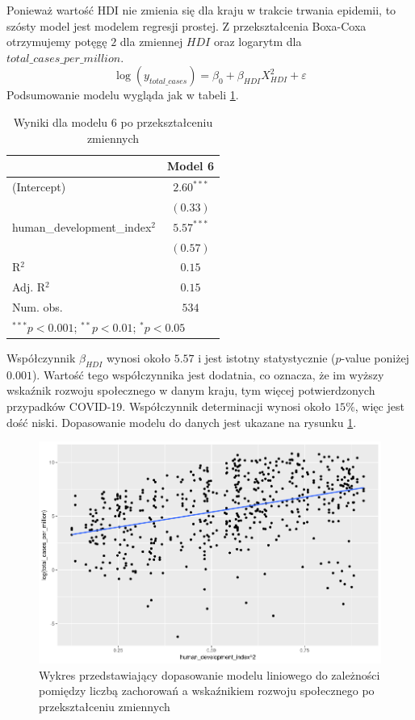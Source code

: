 \documentclass[12pt]{mwbk}
\theoremstyle{plain}
\theoremstyle{definition}
\theoremstyle{definition}
\newcommand\zrodlo[1]{\par\vspace{-3mm}{\small\textit{Źródło: }#1 }}
\begin{document}
Ponieważ wartość HDI nie zmienia się dla kraju w trakcie trwania epidemii, to szósty model jest modelem regresji prostej.
Z przekształcenia Boxa-Coxa otrzymujemy potęgę $2$ dla zmiennej $HDI$ oraz logarytm dla $total\_cases\_per\_million$.
$$\log(y_{total\_cases})=\beta_0+\beta_{HDI}X^2_{HDI}+\varepsilon$$
Podsumowanie modelu wygląda jak w tabeli \ref{table:mod6-log}.
\newpage
\begin{table}[!htbp]
	\begin{center}
		\begin{tabular}{l c}
			\hline
			& Model 6 \\
			\hline
			(Intercept)                   & $2.60^{***}$ \\
			& $(0.33)$     \\
			human\_development\_index$^2$ & $5.57^{***}$ \\
			& $(0.57)$     \\
			\hline
			R$^2$                         & $0.15$       \\
			Adj. R$^2$                    & $0.15$       \\
			Num. obs.                     & $534$        \\
			\hline
			\multicolumn{2}{l}{\scriptsize{$^{***}p<0.001$; $^{**}p<0.01$; $^{*}p<0.05$}}
		\end{tabular}
		\caption{Wyniki dla modelu 6 po przekształceniu zmiennych}
		\label{table:mod6-log}
	\end{center}
\end{table}

Współczynnik $\beta_{HDI}$ wynosi około $5.57$ i jest istotny statystycznie ($p$-value poniżej $0.001$). Wartość tego współczynnika jest dodatnia, co oznacza, że im wyższy wskaźnik rozwoju społecznego w danym kraju, tym więcej potwierdzonych przypadków COVID-19. Współczynnik determinacji wynosi około $15\%$, więc jest dość niski. Dopasowanie modelu do danych jest ukazane na rysunku \ref{fig:mod6-log}.

\begin{figure}[!ht]
	\centering
	\includegraphics[width=\linewidth]{rys/mod6-log.png}
	\caption{Wykres przedstawiający dopasowanie modelu liniowego do zależności pomiędzy liczbą zachorowań a wskaźnikiem rozwoju społecznego po przekształceniu zmiennych}
	\label{fig:mod6-log}
	\zrodlo{Opracowanie własne}
\end{figure}
\end{document}
